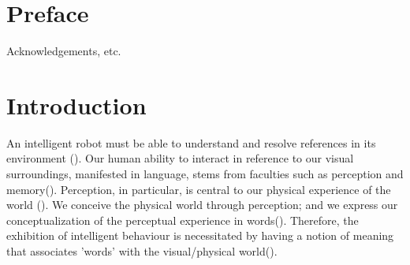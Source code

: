 \documentclass[11pt, a4paper]{article}
\begin{document}
\thispagestyle{empty}

\newpage
\section*{Preface}

Acknowledgements, etc.

\thispagestyle{empty}

\newpage

\begin{spacing}{0.0}
\tableofcontents
\end{spacing}

\thispagestyle{empty}

\newpage
\setcounter{page}{1}

\section{Introduction}
\label{sec:intro}


An intelligent robot must be able to understand and resolve references in its environment (\cite{russell1995artificial}). Our human ability to interact in reference to our visual surroundings, manifested in language, stems from faculties such as perception and memory(\cite{regier1996human}). Perception, in particular, is central to our physical experience of the world (\cite{barsalou1999perceptual}). We conceive the physical world through perception; and we express our conceptualization of the perceptual experience in words(\cite{lakoff2008metaphors}). Therefore, the exhibition of intelligent behaviour is necessitated by having a notion of meaning that associates 'words' with the visual/physical world(\cite{nilsson2007physical}). 
\end{document}
